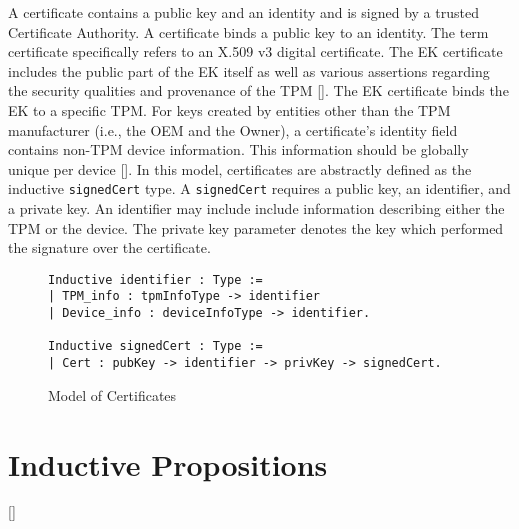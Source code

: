 A certificate contains a public key and an identity and is signed by a trusted Certificate Authority. A certificate binds a public key to an identity. The term certificate specifically refers to an X.509 v3 digital certificate. 
The EK certificate includes the public part of the EK itself as well as various assertions regarding the security qualities and provenance of the TPM [\cite{EKSpec}]. The EK certificate binds the EK to a specific TPM. For keys created by entities other than the TPM manufacturer (i.e., the OEM and the Owner), a certificate's identity field contains non-TPM device information. This information should be globally unique per device [\cite{DevIDSpec-IEEE}]. In this model, certificates are abstractly defined as the inductive \verb|signedCert| type. A \verb|signedCert| requires a public key, an identifier, and a private key. An identifier may include include information describing either the TPM or the device. The private key parameter denotes the key which performed the signature over the certificate.
\begin{figure}[h]
\begin{lstlisting}[language=Coq]
Inductive identifier : Type :=
| TPM_info : tpmInfoType -> identifier
| Device_info : deviceInfoType -> identifier.

Inductive signedCert : Type :=
| Cert : pubKey -> identifier -> privKey -> signedCert.
\end{lstlisting}
\caption{Model of Certificates}
\end{figure}





\section{Inductive Propositions}


[\cite{LogicalFoundations}]